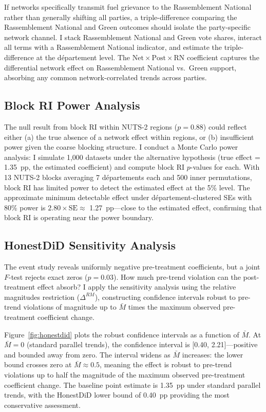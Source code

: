 \documentclass[12pt]{article}
\newcommand{\rn}{Rassemblement National}
\newcommand{\dept}{d\'{e}partement}
\newcommand{\depts}{d\'{e}partements}
\begin{document}
If networks specifically transmit fuel grievance to the \rn{} rather than generally shifting all parties, a triple-difference comparing the \rn{} and Green outcomes should isolate the party-specific network channel. I stack \rn{} and Green vote shares, interact all terms with a \rn{} indicator, and estimate the triple-difference at the \dept{} level. The $\text{Net} \times \text{Post} \times \text{RN}$ coefficient captures the differential network effect on \rn{} vs.\ Green support, absorbing any common network-correlated trends across parties.

\subsection{Block RI Power Analysis}
\label{sec:block_power}

The null result from block RI within NUTS-2 regions ($p = 0.88$) could reflect either (a) the true absence of a network effect within regions, or (b) insufficient power given the coarse blocking structure. I conduct a Monte Carlo power analysis: I simulate 1,000 datasets under the alternative hypothesis (true effect = 1.35~pp, the estimated coefficient) and compute block RI $p$-values for each. With 13 NUTS-2 blocks averaging 7 \depts{} each and 500 inner permutations, block RI has limited power to detect the estimated effect at the 5\% level. The approximate minimum detectable effect under \dept{}-clustered SEs with 80\% power is $2.80 \times \text{SE} \approx$ 1.27~pp---close to the estimated effect, confirming that block RI is operating near the power boundary.

\subsection{HonestDiD Sensitivity Analysis}
\label{sec:honestdid}

The event study reveals uniformly negative pre-treatment coefficients, but a joint $F$-test rejects exact zeros ($p = 0.03$). How much pre-trend violation can the post-treatment effect absorb? I apply the \citet{rambachan2023more} sensitivity analysis using the relative magnitudes restriction ($\Delta^{RM}$), constructing confidence intervals robust to pre-trend violations of magnitude up to $\bar{M}$ times the maximum observed pre-treatment coefficient change.

Figure~\ref{fig:honestdid} plots the robust confidence intervals as a function of $\bar{M}$. At $\bar{M} = 0$ (standard parallel trends), the confidence interval is [0.40, 2.21]---positive and bounded away from zero. The interval widens as $\bar{M}$ increases: the lower bound crosses zero at $\bar{M} \approx 0.5$, meaning the effect is robust to pre-trend violations up to half the magnitude of the maximum observed pre-treatment coefficient change. The baseline point estimate is 1.35~pp under standard parallel trends, with the HonestDiD lower bound of 0.40~pp providing the most conservative assessment.
\end{document}
